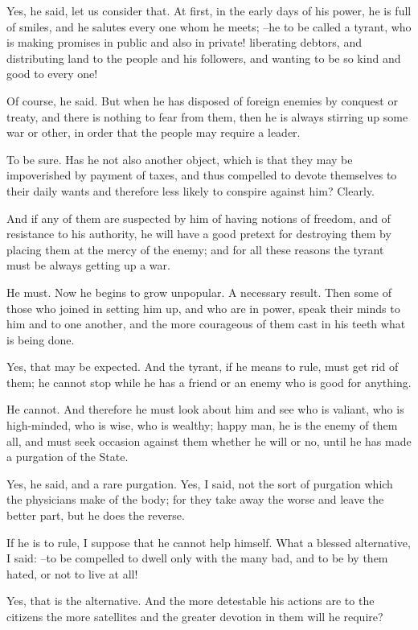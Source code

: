 Yes, he said, let us consider that.
At first, in the early days of his power, he is full of smiles, and he salutes every one whom he meets; --he to be called a tyrant, who is making promises in public and also in private! liberating debtors, and distributing land to the people and his followers, and wanting to be so kind and good to every one!

Of course, he said.
But when he has disposed of foreign enemies by conquest or treaty, and there is nothing to fear from them, then he is always stirring up some war or other, in order that the people may require a leader.

To be sure.
Has he not also another object, which is that they may be impoverished by payment of taxes, and thus compelled to devote themselves to their daily wants and therefore less likely to conspire against him? Clearly.

And if any of them are suspected by him of having notions of freedom, and of resistance to his authority, he will have a good pretext for destroying them by placing them at the mercy of the enemy; and for all these reasons the tyrant must be always getting up a war.

He must.
Now he begins to grow unpopular.
A necessary result.
Then some of those who joined in setting him up, and who are in power, speak their minds to him and to one another, and the more courageous of them cast in his teeth what is being done.

Yes, that may be expected.
And the tyrant, if he means to rule, must get rid of them; he cannot stop while he has a friend or an enemy who is good for anything.

He cannot.
And therefore he must look about him and see who is valiant, who is high-minded, who is wise, who is wealthy; happy man, he is the enemy of them all, and must seek occasion against them whether he will or no, until he has made a purgation of the State.

Yes, he said, and a rare purgation.
Yes, I said, not the sort of purgation which the physicians make of the body; for they take away the worse and leave the better part, but he does the reverse.

If he is to rule, I suppose that he cannot help himself.
What a blessed alternative, I said: --to be compelled to dwell only with the many bad, and to be by them hated, or not to live at all!

Yes, that is the alternative.
And the more detestable his actions are to the citizens the more satellites and the greater devotion in them will he require?

